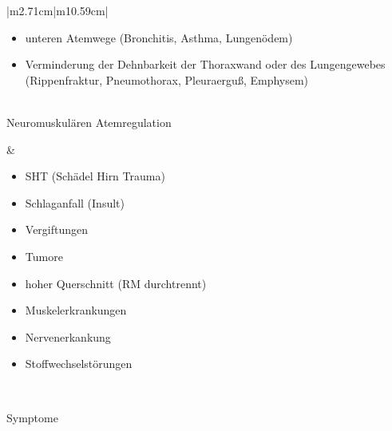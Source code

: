 \documentclass{article}
\begin{document}
\begin{center}
\begin{supertabular}{|m{2.71cm}|m{10.59cm}|}
\begin{itemize}
\item unteren Atemwege (Bronchitis, Asthma, Lungen\"odem)

\end{itemize}
\begin{itemize}
\item Verminderung der Dehnbarkeit der Thoraxwand oder des Lungengewebes
(Rippenfraktur, Pneumothorax, Pleuraergu{\ss}, Emphysem)

\end{itemize}
\\\hline
Neuromuskul\"aren Atemregulation

 &
\begin{itemize}
\item SHT (Sch\"adel Hirn Trauma)

\item Schlaganfall (Insult)

\item Vergiftungen

\item Tumore

\item hoher Querschnitt (RM durchtrennt)

\item Muskelerkrankungen

\item Nervenerkankung

\item Stoffwechselst\"orungen

\end{itemize}
\\\hline
\end{supertabular}
\end{center}
Symptome
\end{document}
